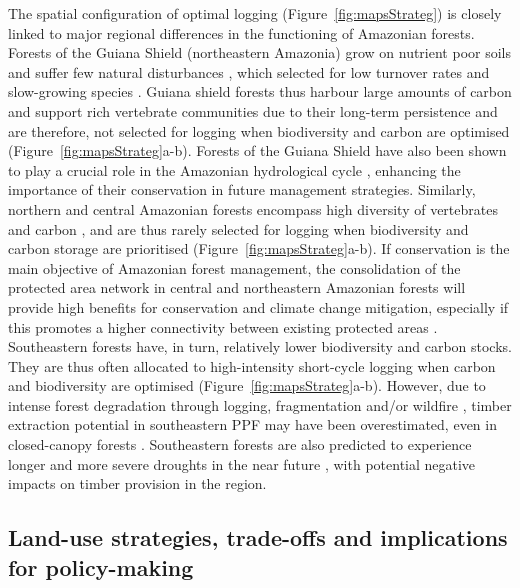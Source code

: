 \documentclass[12pt]{article}
\begin{document}
The spatial configuration of optimal logging (Figure~\ref{fig:mapsStrateg}) is closely linked to major regional differences in the functioning of Amazonian forests. Forests of the Guiana Shield (northeastern Amazonia) grow on nutrient poor soils and suffer few natural disturbances \cite{Espirito-Santo2014}, which selected for low turnover rates and slow-growing species \cite{Grau2017}. Guiana shield forests thus harbour large amounts of carbon \cite{Avitabile2016} and support rich vertebrate communities \cite{Denis2018} due to their long-term persistence \cite{Barthe2017} and are therefore, not selected for logging when biodiversity and carbon are optimised (Figure~\ref{fig:mapsStrateg}a-b). Forests of the Guiana Shield have also been shown to play a crucial role in the Amazonian hydrological cycle \cite{Bovolo2018,Staal2018}, enhancing the importance of their conservation in future management strategies. Similarly, northern and central Amazonian forests encompass high diversity of vertebrates \cite{Jenkins2013} and carbon \cite{Avitabile2016}, and are thus rarely selected for logging when biodiversity and carbon storage are prioritised (Figure~\ref{fig:mapsStrateg}a-b). If conservation is the main objective of Amazonian forest management, the consolidation of the protected area network in central and northeastern Amazonian forests will provide high benefits for conservation and climate change mitigation, especially if this promotes a higher connectivity between existing protected areas \cite{Hansen2007}. Southeastern forests have, in turn, relatively lower biodiversity and carbon stocks. They are thus often allocated to high-intensity short-cycle logging when carbon and biodiversity are optimised (Figure~\ref{fig:mapsStrateg}a-b). However, due to intense forest degradation through logging, fragmentation and/or wildfire \cite{Davidson2012,Foley2007}, timber extraction potential in southeastern PPF may have been overestimated, even in closed-canopy forests \cite{Asner2004}. Southeastern forests are also predicted to experience longer and more severe droughts in the near future \cite{Duffy2015}, with potential negative impacts on timber provision in the region.  
 
\subsection*{Land-use strategies, trade-offs and implications for policy-making}
\end{document}
